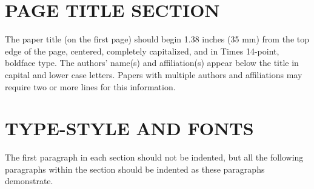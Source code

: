 \documentclass{article}
\begin{document}




\section{PAGE TITLE SECTION}
\label{sec:pagestyle}

The paper title (on the first page) should begin 1.38 inches (35 mm) from the
top edge of the page, centered, completely capitalized, and in Times 14-point,
boldface type.  The authors' name(s) and affiliation(s) appear below the title
in capital and lower case letters.  Papers with multiple authors and
affiliations may require two or more lines for this information.

\section{TYPE-STYLE AND FONTS}
\label{sec:typestyle}


The first paragraph in each section should not be indented, but all the
following paragraphs within the section should be indented as these paragraphs
demonstrate.
\end{document}
